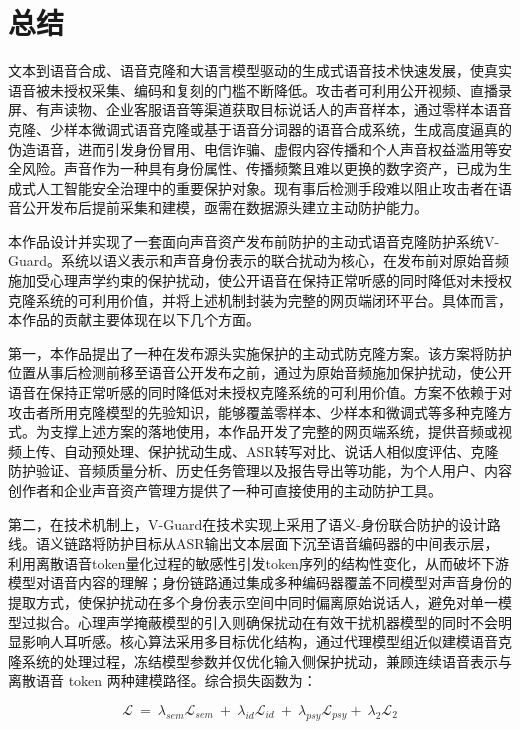 \chapter{总结}\label{ux7b2cux516dux7ae0-ux603bux7ed3}

文本到语音合成、语音克隆和大语言模型驱动的生成式语音技术快速发展，使真实语音被未授权采集、编码和复刻的门槛不断降低。攻击者可利用公开视频、直播录屏、有声读物、企业客服语音等渠道获取目标说话人的声音样本，通过零样本语音克隆、少样本微调式语音克隆或基于语音分词器的语音合成系统，生成高度逼真的伪造语音，进而引发身份冒用、电信诈骗、虚假内容传播和个人声音权益滥用等安全风险。声音作为一种具有身份属性、传播频繁且难以更换的数字资产，已成为生成式人工智能安全治理中的重要保护对象。现有事后检测手段难以阻止攻击者在语音公开发布后提前采集和建模，亟需在数据源头建立主动防护能力。

本作品设计并实现了一套面向声音资产发布前防护的主动式语音克隆防护系统V-Guard。系统以语义表示和声音身份表示的联合扰动为核心，在发布前对原始音频施加受心理声学约束的保护扰动，使公开语音在保持正常听感的同时降低对未授权克隆系统的可利用价值，并将上述机制封装为完整的网页端闭环平台。具体而言，本作品的贡献主要体现在以下几个方面。

第一，本作品提出了一种在发布源头实施保护的主动式防克隆方案。该方案将防护位置从事后检测前移至语音公开发布之前，通过为原始音频施加保护扰动，使公开语音在保持正常听感的同时降低对未授权克隆系统的可利用价值。方案不依赖于对攻击者所用克隆模型的先验知识，能够覆盖零样本、少样本和微调式等多种克隆方式。为支撑上述方案的落地使用，本作品开发了完整的网页端系统，提供音频或视频上传、自动预处理、保护扰动生成、ASR转写对比、说话人相似度评估、克隆防护验证、音频质量分析、历史任务管理以及报告导出等功能，为个人用户、内容创作者和企业声音资产管理方提供了一种可直接使用的主动防护工具。

第二，在技术机制上，V-Guard在技术实现上采用了语义-身份联合防护的设计路线。语义链路将防护目标从ASR输出文本层面下沉至语音编码器的中间表示层，利用离散语音token量化过程的敏感性引发token序列的结构性变化，从而破坏下游模型对语音内容的理解；身份链路通过集成多种编码器覆盖不同模型对声音身份的提取方式，使保护扰动在多个身份表示空间中同时偏离原始说话人，避免对单一模型过拟合。心理声学掩蔽模型的引入则确保扰动在有效干扰机器模型的同时不会明显影响人耳听感。核心算法采用多目标优化结构，通过代理模型组近似建模语音克隆系统的处理过程，冻结模型参数并仅优化输入侧保护扰动，兼顾连续语音表示与离散语音
token 两种建模路径。综合损失函数为：

\[\mathcal{L}\  = \ \lambda_{sem}\mathcal{L}_{sem}\  + \ \lambda_{id}\mathcal{L}_{id}\  + \ \lambda_{psy}\mathcal{L}_{psy} + \ \lambda_{2}\mathcal{L}_{2}\]

